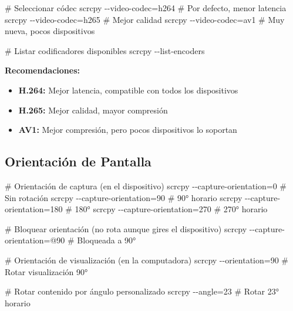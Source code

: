 \documentclass[
  doc,
  floatsintext,
  longtable,
  a4paper,
  nolmodern,
  notxfonts,
  notimes,
  12pt,
  colorlinks=true,linkcolor=blue,citecolor=blue,urlcolor=blue]{apa7}
\newenvironment{Shaded}{\begin{snugshade}}{\end{snugshade}}
\newcommand{\AttributeTok}[1]{\textcolor[rgb]{0.40,0.45,0.13}{#1}}
\newcommand{\CommentTok}[1]{\textcolor[rgb]{0.37,0.37,0.37}{#1}}
\newcommand{\ExtensionTok}[1]{\textcolor[rgb]{0.00,0.23,0.31}{#1}}
\newcommand{\NormalTok}[1]{\textcolor[rgb]{0.00,0.23,0.31}{#1}}
\newcommand{\OperatorTok}[1]{\textcolor[rgb]{0.37,0.37,0.37}{#1}}
\providecommand{\tightlist}{%
  \setlength{\itemsep}{0pt}\setlength{\parskip}{0pt}}
\begin{document}
\begin{Shaded}
\begin{Highlighting}[]
\CommentTok{\# Seleccionar códec}
\ExtensionTok{scrcpy} \AttributeTok{{-}{-}video{-}codec}\OperatorTok{=}\NormalTok{h264  }\CommentTok{\# Por defecto, menor latencia}
\ExtensionTok{scrcpy} \AttributeTok{{-}{-}video{-}codec}\OperatorTok{=}\NormalTok{h265  }\CommentTok{\# Mejor calidad}
\ExtensionTok{scrcpy} \AttributeTok{{-}{-}video{-}codec}\OperatorTok{=}\NormalTok{av1   }\CommentTok{\# Muy nueva, pocos dispositivos}

\CommentTok{\# Listar codificadores disponibles}
\ExtensionTok{scrcpy} \AttributeTok{{-}{-}list{-}encoders}
\end{Highlighting}
\end{Shaded}

\textbf{Recomendaciones:}

\begin{itemize}
\tightlist
\item
  \textbf{H.264:} Mejor latencia, compatible con todos los dispositivos
\item
  \textbf{H.265:} Mejor calidad, mayor compresión
\item
  \textbf{AV1:} Mejor compresión, pero pocos dispositivos lo soportan
\end{itemize}

\subsection{Orientación de Pantalla}\label{orientaciuxf3n-de-pantalla}

\begin{Shaded}
\begin{Highlighting}[]
\CommentTok{\# Orientación de captura (en el dispositivo)}
\ExtensionTok{scrcpy} \AttributeTok{{-}{-}capture{-}orientation}\OperatorTok{=}\NormalTok{0      }\CommentTok{\# Sin rotación}
\ExtensionTok{scrcpy} \AttributeTok{{-}{-}capture{-}orientation}\OperatorTok{=}\NormalTok{90     }\CommentTok{\# 90° horario}
\ExtensionTok{scrcpy} \AttributeTok{{-}{-}capture{-}orientation}\OperatorTok{=}\NormalTok{180    }\CommentTok{\# 180°}
\ExtensionTok{scrcpy} \AttributeTok{{-}{-}capture{-}orientation}\OperatorTok{=}\NormalTok{270    }\CommentTok{\# 270° horario}

\CommentTok{\# Bloquear orientación (no rota aunque gires el dispositivo)}
\ExtensionTok{scrcpy} \AttributeTok{{-}{-}capture{-}orientation}\OperatorTok{=}\NormalTok{@90    }\CommentTok{\# Bloqueada a 90°}

\CommentTok{\# Orientación de visualización (en la computadora)}
\ExtensionTok{scrcpy} \AttributeTok{{-}{-}orientation}\OperatorTok{=}\NormalTok{90             }\CommentTok{\# Rotar visualización 90°}

\CommentTok{\# Rotar contenido por ángulo personalizado}
\ExtensionTok{scrcpy} \AttributeTok{{-}{-}angle}\OperatorTok{=}\NormalTok{23                   }\CommentTok{\# Rotar 23° horario}
\end{Highlighting}
\end{Shaded}
\end{document}
